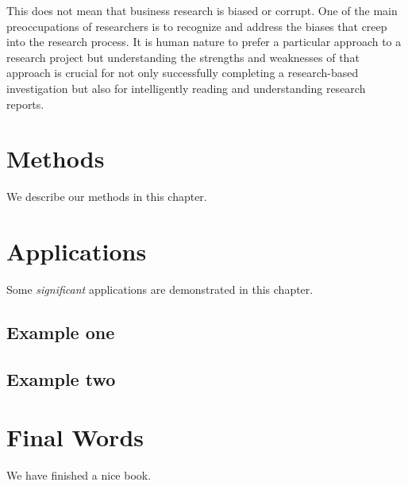 \documentclass[]{book}
\theoremstyle{definition}
\theoremstyle{definition}
\theoremstyle{definition}
\theoremstyle{remark}
\begin{document}
This does not mean that business research is biased or corrupt. One of
the main preoccupations of researchers is to recognize and address the
biases that creep into the research process. It is human nature to
prefer a particular approach to a research project but understanding the
strengths and weaknesses of that approach is crucial for not only
successfully completing a research-based investigation but also for
intelligently reading and understanding research reports.

\hypertarget{methods}{%
\chapter{Methods}\label{methods}}

We describe our methods in this chapter.

\hypertarget{applications}{%
\chapter{Applications}\label{applications}}

Some \emph{significant} applications are demonstrated in this chapter.

\hypertarget{example-one}{%
\section{Example one}\label{example-one}}

\hypertarget{example-two}{%
\section{Example two}\label{example-two}}

\hypertarget{final-words}{%
\chapter{Final Words}\label{final-words}}

We have finished a nice book.


\end{document}

